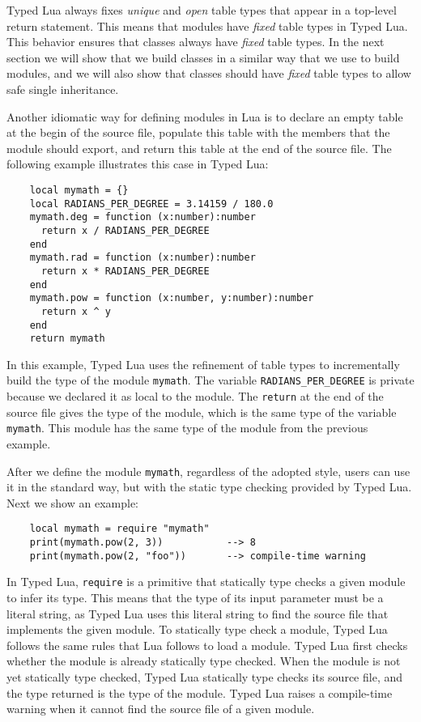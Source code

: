 Typed Lua always fixes \emph{unique} and \emph{open} table types
that appear in a top-level return statement.
This means that modules have \emph{fixed} table types in Typed Lua.
This behavior ensures that classes always have \emph{fixed} table types.
In the next section we will show that we build classes in a
similar way that we use to build modules, and we will also show
that classes should have \emph{fixed} table types to allow safe
single inheritance.

Another idiomatic way for defining modules in Lua is to declare an
empty table at the begin of the source file,
populate this table with the members that the module should export,
and return this table at the end of the source file. 
The following example illustrates this case in Typed Lua:
\begin{verbatim}
    local mymath = {}
    local RADIANS_PER_DEGREE = 3.14159 / 180.0
    mymath.deg = function (x:number):number
      return x / RADIANS_PER_DEGREE
    end
    mymath.rad = function (x:number):number
      return x * RADIANS_PER_DEGREE
    end
    mymath.pow = function (x:number, y:number):number
      return x ^ y
    end
    return mymath
\end{verbatim}

In this example, Typed Lua uses the refinement of table types to
incrementally build the type of the module \texttt{mymath}.
The variable \texttt{RADIANS\string_PER\string_DEGREE}
is private because we declared it as local to the module. 
The \texttt{return} at the end of the source file gives the
type of the module, which is the same type of the variable \texttt{mymath}.
This module has the same type of the module from the previous example.

After we define the module \texttt{mymath}, regardless of the adopted style,
users can use it in the standard way, but with the static type checking
provided by Typed Lua.
Next we show an example:
\begin{verbatim}
    local mymath = require "mymath"
    print(mymath.pow(2, 3))           --> 8
    print(mymath.pow(2, "foo"))       --> compile-time warning
\end{verbatim}

In Typed Lua, \texttt{require} is a primitive that statically type checks
a given module to infer its type.
This means that the type of its input parameter must be a literal string,
as Typed Lua uses this literal string to find the source file that
implements the given module.
To statically type check a module, Typed Lua follows the same rules
that Lua follows to load a module.
Typed Lua first checks whether the module is already statically type checked.
When the module is not yet statically type checked, Typed Lua
statically type checks its source file, and the type returned is the
type of the module.
Typed Lua raises a compile-time warning when it cannot find the source
file of a given module.


